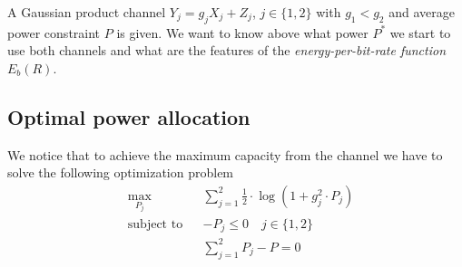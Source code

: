 

A Gaussian product channel $Y_j = g_j X_j + Z_j$, $j\in \{1,2\}$ with $g_1 < g_2$ and average power constraint $P$ is given. We want to know above what power $P^*$ we start to use both channels and what are the features of the \textit{energy-per-bit-rate function} $E_b(R)$.

\subsection{Optimal power allocation}

We notice that to achieve the maximum capacity from the channel we have to solve the following optimization problem
%
\begin{equation}\label{optproblem}
\begin{aligned}
&\max_{P_j} && \sum_{j=1}^2 \frac{1}{2} \cdot \log(1+g_j^2 \cdot P_j)\\
&\text{subject to}&& -P_j \leq 0 \quad j\in \{1,2\} \\
& 		   && \sum_{j=1}^2 P_j - P = 0
\end{aligned}
\end{equation}

